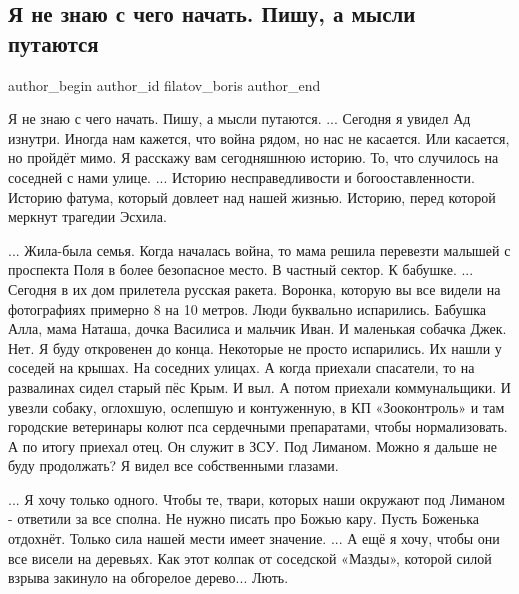  
 
 
 
 
 
\subsection{Я не знаю с чего начать. Пишу, а мысли путаются}
\label{sec:29_09_2022.fb.filatov_boris.1.s_chego_nachat}
 

\ifcmt
 author_begin
   author_id filatov_boris
 author_end
\fi

\obeycr
Я не знаю с чего начать.
Пишу, а мысли путаются.
...
Сегодня я увидел Ад изнутри.
Иногда нам кажется, что война рядом, но нас не касается.
Или касается, но пройдёт мимо.
Я расскажу вам сегодняшнюю историю.
То, что случилось на соседней с нами улице.
... 
Историю несправедливости и богооставленности.
Историю фатума, который довлеет над нашей жизнью.
Историю, перед которой меркнут трагедии Эсхила.
\restorecr


\obeycr
...
Жила-была семья. 
Когда началась война, то мама решила перевезти малышей с проспекта Поля в более безопасное место.
В частный сектор. К бабушке.
...
Сегодня в их дом прилетела русская ракета.
Воронка, которую вы все видели на фотографиях примерно 8 на 10 метров.
Люди буквально испарились. Бабушка Алла, мама Наташа, дочка Василиса  и мальчик Иван.
И маленькая собачка Джек.
Нет. Я буду откровенен до конца. Некоторые не просто испарились.
Их нашли у соседей на крышах. 
На соседних улицах.
А когда приехали спасатели, то на развалинах сидел старый пёс Крым.
И выл.
А потом приехали коммунальщики. 
И увезли собаку, оглохшую, ослепшую и контуженную, в КП «Зооконтроль» и там городские ветеринары колют пса сердечными препаратами, чтобы нормализовать.
А по итогу приехал отец.
Он служит в ЗСУ. Под Лиманом.
Можно я дальше не буду продолжать?
Я видел все собственными глазами.
\restorecr

\obeycr
...
Я хочу только одного.
Чтобы те, твари, которых наши окружают под Лиманом - ответили за все сполна.
Не нужно писать про Божью кару.
Пусть Боженька отдохнёт.
Только сила нашей мести имеет значение.
...
А ещё я хочу, чтобы они все висели на деревьях.
Как этот колпак от соседской «Мазды», которой силой взрыва закинуло на обгорелое дерево...
Лють.
\restorecr

